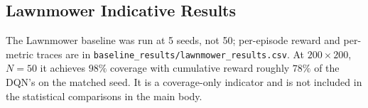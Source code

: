 \subsection*{Lawnmower Indicative Results}

The Lawnmower baseline was run at 5 seeds, not 50; per-episode reward
and per-metric traces are in \texttt{baseline\_results/lawnmower\_results.csv}.
At $200{\times}200$, $N{=}50$ it achieves $98\%$ coverage with cumulative
reward roughly $78\%$ of the DQN's on the matched seed. It is a
coverage-only indicator and is not included in the statistical comparisons
in the main body.
